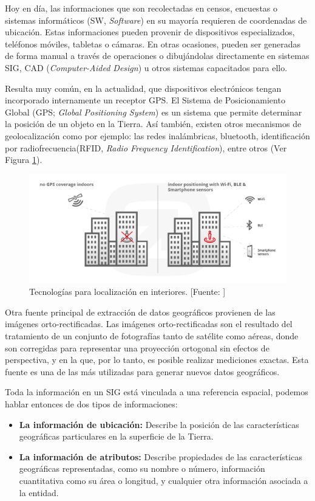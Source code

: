 Hoy en día, las informaciones que son recolectadas en censos, encuestas o sistemas informáticos (SW, \textit{Software}) en su mayoría requieren de coordenadas de ubicación. Estas informaciones pueden provenir de dispositivos especializados, teléfonos móviles, tabletas o cámaras. En otras ocasiones, pueden ser generadas de forma manual a través de operaciones o dibujándolas directamente en sistemas SIG, CAD (\textit{Computer-Aided Design}) u otros sistemas capacitados para ello.

Resulta muy común, en la actualidad, que dispositivos electrónicos tengan incorporado internamente un receptor GPS. El Sistema de Posicionamiento Global (GPS; \textit{Global Positioning System}) es un sistema que permite determinar la posición de un objeto en la Tierra. Así también, existen otros mecanismos de geolocalización como por ejemplo: las redes inalámbricas, bluetooth, identificación por radiofrecuencia(RFID, \textit{Radio Frequency Identification}), entre otros (Ver Figura \ref{fig:interioresTech}).

\begin{figure}[H]
    \centering
    \includegraphics[width=14.5cm]{Indoor_tech.jpg}
    \caption{Tecnologías para localización en interiores. [Fuente: ]}
    \label{fig:interioresTech}
\end{figure}

Otra fuente principal de extracción de datos geográficos provienen de las imágenes orto-rectificadas. Las imágenes orto-rectificadas son el resultado del tratamiento de un conjunto de fotografías tanto de satélite como aéreas, donde son corregidas para representar una proyección ortogonal sin efectos de perspectiva, y en la que, por lo tanto, es posible realizar mediciones exactas. Esta fuente es una de las más utilizadas para generar nuevos datos geográficos.

Toda la información en un SIG está vinculada a una referencia espacial, podemos hablar entonces de dos tipos de informaciones: 
\begin{itemize}
    \item \textbf{La información de ubicación:} 
    Describe la posición de las características geográficas particulares en la superficie de la Tierra.
    \item \textbf{La información de atributos:} 
    Describe propiedades de las características geográficas representadas, como su nombre o número, información cuantitativa como su área o longitud, y cualquier otra información asociada a la entidad.
\end{itemize}

